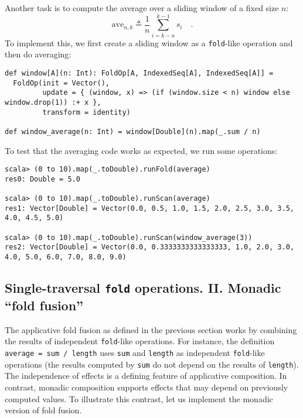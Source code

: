 Another task is to compute the average over a sliding window of a
fixed size $n$:
\[
\text{ave}_{n,k}\triangleq\frac{1}{n}\sum_{i=k-n}^{k-1}s_{i}\quad.
\]
To implement this, we first create a sliding window as a \lstinline!fold!-like
operation and then do averaging:
\begin{lstlisting}
def window[A](n: Int): FoldOp[A, IndexedSeq[A], IndexedSeq[A]] =
  FoldOp(init = Vector(),
         update = { (window, x) => (if (window.size < n) window else window.drop(1)) :+ x },
         transform = identity)

def window_average(n: Int) = window[Double](n).map(_.sum / n)
\end{lstlisting}
To test that the averaging code works as expected, we run some  operations:
\begin{lstlisting}
scala> (0 to 10).map(_.toDouble).runFold(average)
res0: Double = 5.0

scala> (0 to 10).map(_.toDouble).runScan(average)
res1: Vector[Double] = Vector(0.0, 0.5, 1.0, 1.5, 2.0, 2.5, 3.0, 3.5, 4.0, 4.5, 5.0)

scala> (0 to 10).map(_.toDouble).runScan(window_average(3))
res2: Vector[Double] = Vector(0.0, 0.3333333333333333, 1.0, 2.0, 3.0, 4.0, 5.0, 6.0, 7.0, 8.0, 9.0)
\end{lstlisting}


\subsection{Single-traversal \texttt{fold} operations. II. Monadic \textquotedblleft fold
fusion\textquotedblright}

The applicative fold fusion as defined in the previous section works
by combining the results of independent \lstinline!fold!-like operations.
For instance, the definition \lstinline!average = sum / length! uses
\lstinline!sum! and \lstinline!length! as independent \lstinline!fold!-like
operations (the results computed by \lstinline!sum! do not depend
on the results of \lstinline!length!). The independence of effects
is a defining feature of applicative composition. In contrast, monadic
composition supports effects that may depend on previously computed
values. To illustrate this contrast, let us implement the monadic
version of fold fusion.

